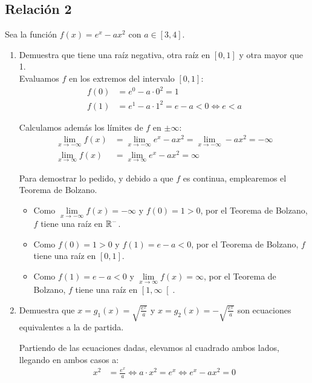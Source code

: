 \subsection{Relación 2}
\setcounter{ejercicio}{0}


\begin{ejercicio}
    Sea la función $f(x) = e^x - ax^2$ con $a \in [3, 4]$.
    \begin{enumerate}
        \item Demuestra que tiene una raíz negativa, otra raíz en $[0, 1]$ y otra mayor que 1.\\
        
        Evaluamos $f$ en los extremos del intervalo $[0,1]$:
        \begin{align*}
            f(0) &= e^0 - a\cdot 0^2 = 1\\
            f(1) &= e^1 - a\cdot 1^2 = e - a<0 \Longleftrightarrow e < a
        \end{align*}

        Calculamos además los límites de $f$ en $\pm \infty$:
        \begin{align*}
            \lim_{x\to -\infty} f(x) &= \lim_{x\to -\infty} e^x - ax^2 = \lim_{x\to -\infty} -ax^2 = -\infty\\
            \lim_{x\to \infty} f(x) &= \lim_{x\to \infty} e^x - ax^2 = \infty
        \end{align*}

        Para demostrar lo pedido, y debido a que $f$ es continua, emplearemos el Teorema de Bolzano.
        \begin{itemize}
            \item Como $\lim\limits_{x\to -\infty} f(x) = -\infty$ y $f(0) = 1>0$, por el Teorema de Bolzano, $f$ tiene una raíz en $\mathbb{R}^-$.
            \item Como $f(0) = 1>0$ y $f(1) = e - a < 0$, por el Teorema de Bolzano, $f$ tiene una raíz en $[0,1]$.
            \item Como $f(1) = e - a < 0$ y $\lim\limits_{x\to \infty} f(x) = \infty$, por el Teorema de Bolzano, $f$ tiene una raíz en $\left[1, \infty\right[$.
        \end{itemize}
        \item Demuestra que $x = g_1(x) = \sqrt{\frac{e^x}{a}}$ y $x = g_2(x) = -\sqrt{\frac{e^x}{a}}$ son ecuaciones equivalentes a la de partida.
        
        Partiendo de las ecuaciones dadas, elevamos al cuadrado ambos lados, llegando en ambos casos a:
        \begin{align*}
            x^2 &= \frac{e^x}{a} \iff a\cdot x^2 = e^x \iff e^x - ax^2 = 0
        \end{align*}


\end{enumerate}
\end{ejercicio}
